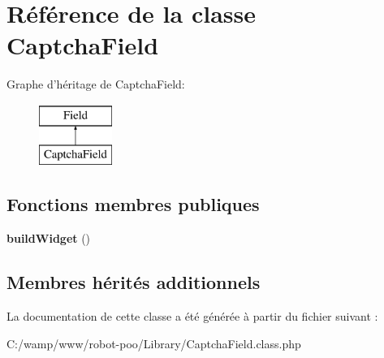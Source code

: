\hypertarget{class_library_1_1_captcha_field}{\section{Référence de la classe Captcha\+Field}
\label{class_library_1_1_captcha_field}
}
Graphe d'héritage de Captcha\+Field\+:\begin{figure}[H]
\begin{center}
\leavevmode
\includegraphics[height=2.000000cm]{class_library_1_1_captcha_field}
\end{center}
\end{figure}
\subsection*{Fonctions membres publiques}
\begin{DoxyCompactItemize}
\item 
\hypertarget{class_library_1_1_captcha_field_a3724547eb0ec2b00884571328d7e2d5d}{{\bfseries build\+Widget} ()}\label{class_library_1_1_captcha_field_a3724547eb0ec2b00884571328d7e2d5d}

\end{DoxyCompactItemize}
\subsection*{Membres hérités additionnels}


La documentation de cette classe a été générée à partir du fichier suivant \+:\begin{DoxyCompactItemize}
\item 
C\+:/wamp/www/robot-\/poo/\+Library/Captcha\+Field.\+class.\+php\end{DoxyCompactItemize}
